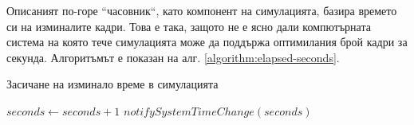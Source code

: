 		\newpage			
		
		Описаният по-горе ``часовник``, като компонент на симулацията, базира времето си
		на изминалите кадри. Това е така, защото не е ясно дали компютърната система
		на която тече симулацията може да поддържа оптимилания брой кадри за секунда.
		Алгоритъмът е показан на алг. \ref{algorithm:elapsed-seconds}.
		
		\begin{algorithm}				
			\caption{Засичане на изминало време в симулацията}				
			\label{algorithm:elapsed-seconds}
			\begin{algorithmic}
					\State $seconds\gets seconds+1$
					\State $notifySystemTimeChange(seconds)$
				\EndIf
			\end{algorithmic}
		\end{algorithm}			